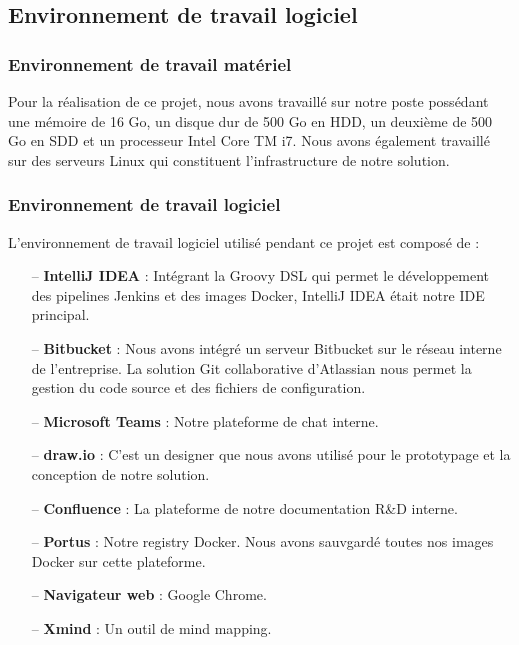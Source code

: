 \begin{spacing}{1.2}
\subsection{Environnement de travail logiciel}
\subsubsection{Environnement de travail matériel}
Pour la réalisation de ce projet, nous avons travaillé sur notre poste possédant une mémoire de 16 Go, un disque dur de 500 Go en HDD, un deuxième de 500 Go en SDD et un processeur Intel Core TM i7. Nous avons également travaillé sur des serveurs Linux qui constituent l'infrastructure de notre solution. 
\subsubsection{Environnement de travail logiciel}
L'environnement de travail logiciel utilisé pendant ce projet est composé de :
\begin{itemize}
    \setlength\itemsep{0em}
    \item[--] \textbf{IntelliJ IDEA} : Intégrant la Groovy DSL qui permet le développement des pipelines Jenkins et des images Docker, IntelliJ IDEA était notre IDE principal. 
    \item[--] \textbf{Bitbucket} : Nous avons intégré un serveur Bitbucket sur le réseau interne de l’entreprise. La solution Git collaborative d'Atlassian nous permet la gestion du code source et des fichiers de configuration.
    \item[--] \textbf{Microsoft Teams} : Notre plateforme de chat interne. 
    \item[--] \textbf{draw.io} : C'est un designer que nous avons utilisé pour le prototypage et la conception de notre solution. 
    \item[--] \textbf{Confluence} : La plateforme de notre documentation R\&D interne.
    \item[--] \textbf{Portus} : Notre registry Docker. Nous avons sauvgardé toutes nos images Docker sur cette plateforme.
    \item[--] \textbf{Navigateur web} : Google Chrome.
    \item[--] \textbf{Xmind} : Un outil de mind mapping. 
\end{itemize}

\end{spacing}
